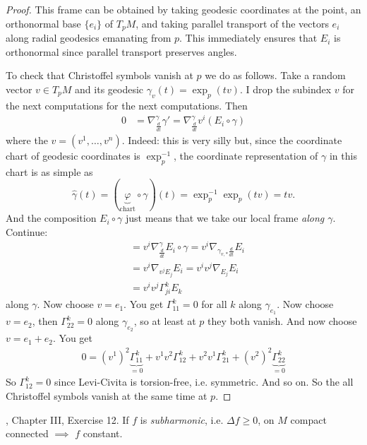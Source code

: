 \begin{proof}
This frame can be obtained by taking geodesic coordinates at the point, an
orthonormal base $\{e_i\}$ of $T_pM$, and taking parallel transport of the
vectors $e_i$ along radial geodesics emanating from $p$. This immediately
ensures that $E_i$ is orthonormal since parallel transport preserves angles.

To check that Christoffel symbols vanish at $p$ we do as follows. 
Take a random vector $v \in T_pM$ and its geodesic
$\gamma_v(t)=\operatorname{exp}_p(tv)$. I drop the subindex $v$ for the next
computations for the next computations. Then
\begin{align*}
0&=\nabla_{\frac{d}{dt}}^{\gamma}\gamma'
=\nabla^{\gamma}_{\frac{d}{dt}}v^i(E_i\circ \gamma)
\end{align*}
where the $v=(v^1,\ldots,v^n)$. Indeed: this is very silly but, since the 
coordinate chart of geodesic coordinates is $\operatorname{exp}_p^{-1}$, 
the coordinate representation of $\gamma$ in this chart is as simple as
$$
\hat{\gamma}(t)=(\underbrace{\varphi}_{\text{chart}} \circ \gamma)(t)
=\operatorname{exp}_p^{-1} \operatorname{exp}_p(tv)=tv.
$$
And the composition $E_i \circ \gamma$ just means that we take our local 
frame \textit{along $\gamma$}. Continue:
\begin{align*}
&=v^i\nabla^{\gamma}_{\frac{d}{dt}}E_i\circ\gamma
=v^i\nabla_{\gamma_{v,*} \frac{d}{dt}}E_i\\
&=v^i\nabla_{v^jE_j}E_i=v^iv^j\nabla_{E_j}E_i\\&
=v^iv^j\Gamma_{ji}^kE_k
\end{align*}
along $\gamma$. Now choose $v=e_1$. You get $\Gamma_{11}^k=0$ for all $k$ along $\gamma_{e_1}$. Now choose $v=e_2$, then $\Gamma_{22}^k=0$ along $\gamma_{e_2}$, so at least at $p$ they both vanish. And now choose $v=e_1+e_2$. You get
\begin{align*}
0=(v^1)^2 \underbrace{\Gamma_{1 1}^k}_{=0}
+v^1v^2 \Gamma_{1 2}^k+v^2v^1\Gamma_{2 1}^k
+(v^2)^2\underbrace{\Gamma_{2 2}^k}_{=0}
\end{align*}
So $\Gamma_{12}^k=0$ since Levi-Civita is torsion-free, i.e. symmetric. 
And so on. So the all Christoffel symbols vanish at the same time at $p$.
\end{proof}

\begin{exercise}
\label{exercise-maximum-principle}
\cite{doc}, Chapter III, Exercise 12. If $f$ is {\it subharmonic}, i.e. 
$\Delta f\geq 0$, on $M$ 
compact connected $\implies$ $f$ constant.
\end{exercise}

